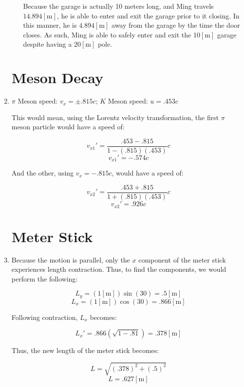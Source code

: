 \begin{enumerate}
\begin{enumerate}
        Because the garage is actually 10 meters long, and Ming travels $14.894[\si{\meter}]$, he is able to enter and exit the garage prior to it closing. In this manner, he is $4.894[\si{\meter}]$ away from the garage by the time the door closes. As such, Ming is able to safely enter and exit the 10$[\si{\meter}]$ garage despite having a 20$[\si{\meter}]$ pole.

    \end{enumerate}

    \section{Meson Decay}

  \item $\pi$ Meson speed: $v_x=\pm.815c$; $K$ Meson speed: $u=.453c$

    This would mean, using the Lorentz velocity transformation, the first $\pi$ meson particle would have a speed of:

    $$v_{x1}'=\frac{.453-.815}{1-(.815)(.453)}c$$
    $$\boxed{v_{x1}'=-.574c}$$

    And the other, using $v_x=-.815c$, would have a speed of:

    $$v_{x2}'=\frac{.453+.815}{1+(.815)(.453)}c$$
    $$\boxed{v_{x2}'=.926c}$$

    \section{Meter Stick}

  \item Because the motion is parallel, only the $x$ component of the meter stick experiences length contraction. Thus, to find the components, we would perform the following:

    $$L_y=(1[\si{\meter}])\sin(30)=.5[\si{\meter}]$$
    $$L_x=(1[\si{\meter}])\cos(30)=.866[\si{\meter}]$$

      Following contraction, $L_x$ becomes:

      $$L_x'=.866(\sqrt{1-.81})=.378[\si{\meter}]$$

      Thus, the new length of the meter stick becomes:

      $$L=\sqrt{(.378)^2+(.5)^2}$$
      $$\boxed{L=.627[\si{\meter}]}$$


\end{enumerate}



